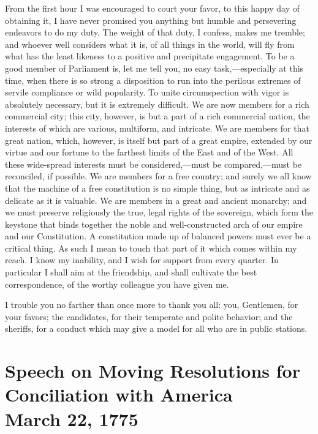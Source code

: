 From the first hour I was encouraged to court your favor, to this happy day of obtaining it, I have never promised you anything but humble and persevering endeavors to do my duty. The weight of that duty, I confess, makes me tremble; and whoever well considers what it is, of all things in the world, will fly from what has the least likeness to a positive and precipitate engagement. To be a good member of Parliament is, let me tell you, no easy task,—especially at this time, when there is so strong a disposition to run into the perilous extremes of servile compliance or wild popularity. To unite circumspection with vigor is absolutely necessary, but it is extremely difficult. We are now members for a rich commercial city; this city, however, is but a part of a rich commercial nation, the interests of which are various, multiform, and intricate. We are members for that great nation, which, however, is itself but part of a great empire, extended by our virtue and our fortune to the farthest limits of the East and of the West. All these wide-spread interests must be considered,—must be compared,—must be reconciled, if possible. We are members for a free country; and surely we all know that the machine of a free constitution is no simple thing, but as intricate and as delicate as it is valuable. We are members in a great and ancient monarchy; and we must preserve religiously the true, legal rights of the sovereign, which form the keystone that binds together the noble and well-constructed arch of our empire and our Constitution. A constitution made up of balanced powers must ever be a critical thing. As such I mean to touch that part of it which comes within my reach. I know my inability, and I wish for support from every quarter. In particular I shall aim at the friendship, and shall cultivate the best correspondence, of the worthy colleague you have given me.

I trouble you no farther than once more to thank you all: you, Gentlemen, for your favors; the candidates, for their temperate and polite behavior; and the sheriffs, for a conduct which may give a model for all who are in public stations.



\chapter*[Speech on Conciliation with America]{Speech on Moving Resolutions
for Conciliation with America
\\ \vspace{0.1cm}\large{March 22, 1775}}

